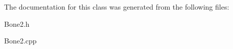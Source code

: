 The documentation for this class was generated from the following files\+:\begin{DoxyCompactItemize}
\item 
Bone2.\+h\item 
Bone2.\+cpp\end{DoxyCompactItemize}
